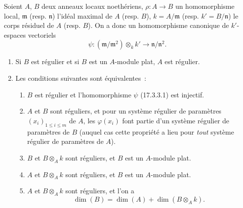 \begin{proposition}[17.3.3]
\label{0.17.3.3-fr}
Soient $A$, $B$ deux anneaux locaux noethériens,
$\rho:A\longrightarrow B$ un homomorphisme local, $\mathfrak{m}$ \textup{(resp.
$\mathfrak{n}$)} l'idéal maximal de $A$ \textup{(resp. $B$)},
$k=A/\mathfrak{m}$ \textup{(resp. $k'=B/\mathfrak{n}$)} le corps résiduel de $A$
\textup{(resp. $B$)}. On a donc un homomorphisme canonique de $k'$-espaces vectoriels
\begin{equation}
\label{0.17.3.3.1-fr}
\tag{17.3.3.1}
  \psi:(\mathfrak{m}/\mathfrak{m}^2)\otimes_k k'
  \longrightarrow\mathfrak{n}/\mathfrak{n}^2.
\end{equation}
\begin{enumerate}
  \item[\rm (i)] Si $B$ est régulier et si $B$ est un $A$-module plat, $A$
  est régulier.
  \item[\rm (ii)] Les conditions suivantes sont équivalentes~:
  \begin{enumerate}
    \item[\textit{a)}] $B$ est régulier et l'homomorphisme $\psi$ \textup{(17.3.3.1)} est
    injectif.
    \item[\textit{b)}] $A$ et $B$ sont réguliers, et pour un système régulier de
    paramètres $(x_i)_{1\leq i\leq m}$ de $A$, les $\varphi(x_i)$ font partie
    d'un système régulier de paramètres de $B$ \textup{(auquel cas cette propriété a
    lieu pour \emph{tout} système régulier de paramètres de $A$)}.
    \item[\textit{c)}] $B$ et $B\otimes_A k$ sont réguliers, et $B$ est un
    $A$-module plat.
    \item[\textit{d)}] $A$ et $B\otimes_A k$ sont réguliers, et $B$ est un
    $A$-module plat.
    \item[\textit{e)}] $A$ et $B\otimes_A k$ sont réguliers, et l'on a
    \begin{equation}
    \label{0.17.3.3.2-fr}
    \tag{17.3.3.2}
      \dim(B)=\dim(A)+\dim(B\otimes_A k).
    \end{equation}
  \end{enumerate}
\end{enumerate}
\end{proposition}

